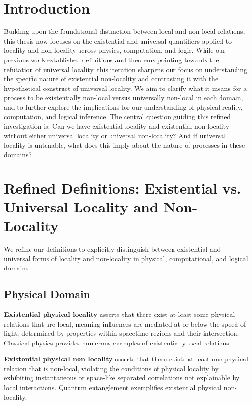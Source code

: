 \section{Introduction}

Building upon the foundational distinction between local and non-local relations, this thesis now focuses on the existential and universal quantifiers applied to locality and non-locality across physics, computation, and logic.  While our previous work established definitions and theorems pointing towards the refutation of universal locality, this iteration sharpens our focus on understanding the specific nature of existential non-locality and contrasting it with the hypothetical construct of universal locality.  We aim to clarify what it means for a process to be existentially non-local versus universally non-local in each domain, and to further explore the implications for our understanding of physical reality, computation, and logical inference.  The central question guiding this refined investigation is: Can we have existential locality and existential non-locality without either universal locality or universal non-locality?  And if universal locality is untenable, what does this imply about the nature of processes in these domains?

\section{Refined Definitions: Existential vs. Universal Locality and Non-Locality}

We refine our definitions to explicitly distinguish between existential and universal forms of locality and non-locality in physical, computational, and logical domains.

\subsection{Physical Domain}

\begin{definition}
	\textbf{Existential physical locality} asserts that there exist at least some physical relations that are local, meaning influences are mediated at or below the speed of light, determined by properties within spacetime regions and their intersection.  Classical physics provides numerous examples of existentially local relations.
\end{definition}

\begin{definition}
	\textbf{Existential physical non-locality} asserts that there exists at least one physical relation that is non-local, violating the conditions of physical locality by exhibiting instantaneous or space-like separated correlations not explainable by local interactions. Quantum entanglement exemplifies existential physical non-locality.
\end{definition}


